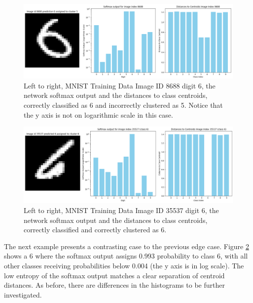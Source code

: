 
\begin{figure}[ht]
    \centering
    \includegraphics[width=0.99\columnwidth]{Figures/ImageID8688_Softmax_Clustering.png}
    \caption{Left to right, MNIST Training Data Image ID 8688 digit 6, the network softmax output and the distances to class centroids, correctly classified as 6 and incorrectly clustered as 5. Notice that the y axis is not on logarithmic scale in this case.   
    }
\label{fig:ImageID8688_Softmax_Clustering}
\end{figure}

\begin{figure}[ht!]
    \centering
\includegraphics[width=0.99\columnwidth]{Figures/ImageID35537_Softmax_Clustering.png}
    \caption{Left to right, MNIST Training Data Image ID 35537 digit 6, the network softmax output and the distances to class centroids, correctly classified and correctly clustered as 6.     %
    }
\label{fig:ImageID35537_Softmax_Clustering}
\end{figure}

The next example presents a contrasting case to the previous edge case. Figure \ref{fig:ImageID35537_Softmax_Clustering} shows a 6 where the softmax output assigns 0.993 probability to class 6, with all other classes receiving probabilities below 0.004 (the y axis is in log scale). The low entropy of the softmax output matches a clear separation of centroid distances. As before, there are differences in the histograms to be further investigated. 

